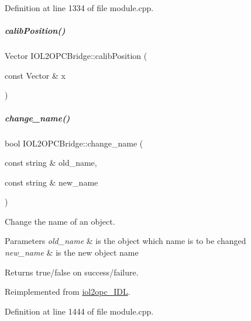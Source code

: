 Definition at line 1334 of file module.\+cpp.

\mbox{\label{group__iol2opc_a04b7cefdcd8c2ea856d348af2c07cb12}} 
\subparagraph{\texorpdfstring{calib\+Position()}{calibPosition()}}
{\footnotesize\ttfamily Vector I\+O\+L2\+O\+P\+C\+Bridge\+::calib\+Position (\begin{DoxyParamCaption}\item[{const Vector \&}]{x }\end{DoxyParamCaption})\hspace{0.3cm}{\ttfamily [protected]}}

\mbox{\label{group__iol2opc_ae91edb0bb7a3b851e2387cda653d80fb}} 
\subparagraph{\texorpdfstring{change\+\_\+name()}{change\_name()}}
{\footnotesize\ttfamily bool I\+O\+L2\+O\+P\+C\+Bridge\+::change\+\_\+name (\begin{DoxyParamCaption}\item[{const string \&}]{old\+\_\+name,  }\item[{const string \&}]{new\+\_\+name }\end{DoxyParamCaption})\hspace{0.3cm}{\ttfamily [virtual]}}



Change the name of an object. 


\begin{DoxyParams}{Parameters}
{\em old\+\_\+name} & is the object which name is to be changed \\
\hline
{\em new\+\_\+name} & is the new object name \\
\hline
\end{DoxyParams}
\begin{DoxyReturn}{Returns}
true/false on success/failure. 
\end{DoxyReturn}


Reimplemented from \hyperlink{classiol2opc__IDL_a18ecf43816b0df1187a208df18fb98a7}{iol2opc\+\_\+\+I\+DL}.



Definition at line 1444 of file module.\+cpp.

